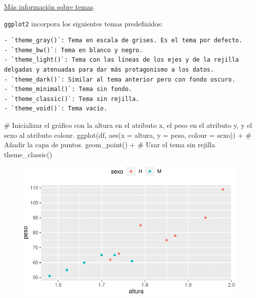 \documentclass[
  a4paper,
]{scrreport}
\newenvironment{Shaded}{\begin{snugshade}}{\end{snugshade}}
\newcommand{\AttributeTok}[1]{\textcolor[rgb]{0.40,0.45,0.13}{#1}}
\newcommand{\CommentTok}[1]{\textcolor[rgb]{0.37,0.37,0.37}{#1}}
\newcommand{\FunctionTok}[1]{\textcolor[rgb]{0.28,0.35,0.67}{#1}}
\newcommand{\NormalTok}[1]{\textcolor[rgb]{0.00,0.23,0.31}{#1}}
\newcommand{\SpecialCharTok}[1]{\textcolor[rgb]{0.37,0.37,0.37}{#1}}
\theoremstyle{definition}
\theoremstyle{definition}
\theoremstyle{remark}
\begin{document}
\href{https://ggplot2.tidyverse.org/reference/theme.html}{Más
información sobre temas}.

\texttt{ggplot2} incorpora los siguientes temas predefinidos:

\begin{verbatim}
- `theme_gray()`: Tema en escala de grises. Es el tema por defecto.
- `theme_bw()`: Tema en blanco y negro.
- `theme_light()`: Tema con las líneas de los ejes y de la rejilla delgadas y atenuadas para dar más protagonismo a los datos.
- `theme_dark()`: Similar al tema anterior pero con fondo oscuro.
- `theme_minimal()`: Tema sin fondo.
- `theme_classic()`: Tema sin rejilla.
- `theme_void()`: Tema vacío.
\end{verbatim}

\begin{Shaded}
\begin{Highlighting}[]
\CommentTok{\# Inicializar el gráfico con la altura en el atributo x, el peso en el atributo y, y el sexo al atributo colour.}
\FunctionTok{ggplot}\NormalTok{(df, }\FunctionTok{aes}\NormalTok{(}\AttributeTok{x =}\NormalTok{ altura, }\AttributeTok{y =}\NormalTok{ peso, }\AttributeTok{colour =}\NormalTok{ sexo)) }\SpecialCharTok{+}
\CommentTok{\# Añadir la capa de puntos.}
    \FunctionTok{geom\_point}\NormalTok{() }\SpecialCharTok{+}
\CommentTok{\# Usar el tema sin rejilla}
    \FunctionTok{theme\_classic}\NormalTok{()}
\end{Highlighting}
\end{Shaded}

\begin{figure}[H]

{\centering \includegraphics{./07-graficos_files/figure-pdf/unnamed-chunk-31-1.pdf}

}

\end{figure}
\end{document}
